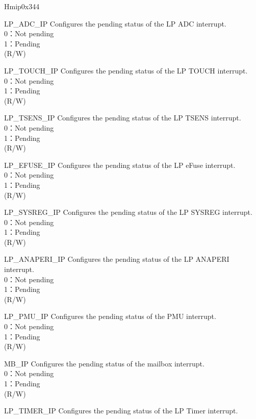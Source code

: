 \begin{register}{H}{mip}{0x344}
\begin{regdesc}
\begin{reglist}
\label{fielddesc:LPMIPADCIP}\item [LP\_ADC\_IP] Configures the pending status of the LP ADC interrupt.\\
0：Not pending\\
1：Pending \\(R/W)
\label{fielddesc:LPMIPTOUCHIP}\item [LP\_TOUCH\_IP] Configures the pending status of the LP TOUCH interrupt.\\
0：Not pending\\
1：Pending \\(R/W)
\label{fielddesc:LPMIPTSENSIP}\item [LP\_TSENS\_IP] Configures the pending status of the LP TSENS interrupt.\\
0：Not pending\\
1：Pending \\(R/W)
\label{fielddesc:LPMIPEFUSEIP}\item [LP\_EFUSE\_IP] Configures the pending status of the LP eFuse interrupt.\\
0：Not pending\\
1：Pending \\(R/W)
\label{fielddesc:LPMIPSYSREGIP}\item [LP\_SYSREG\_IP] Configures the pending status of the LP SYSREG interrupt.\\
0：Not pending\\
1：Pending \\(R/W)
\label{fielddesc:LPMIPANAPERIIP}\item [LP\_ANAPERI\_IP] Configures the pending status of the LP ANAPERI interrupt.\\
0：Not pending\\
1：Pending \\(R/W)
\label{fielddesc:LPMIPPMUIP}\item [LP\_PMU\_IP] Configures the pending status of the PMU interrupt.\\
0：Not pending\\
1：Pending \\(R/W)
\label{fielddesc:LPMIPMBIP}\item [MB\_IP] Configures the pending status of the mailbox interrupt.\\
0：Not pending\\
1：Pending \\(R/W)
\label{fielddesc:LPMIPTIMERIP}\item [LP\_TIMER\_IP] Configures the pending status of the LP Timer interrupt.\\

\end{reglist}
\end{regdesc}
\end{register}
